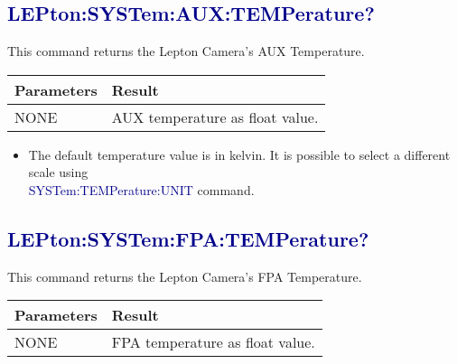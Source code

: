 \documentclass[10pt,a4paper]{article}
\begin{document}

\subsection*{\textcolor{darkblue}{LEPton:SYSTem:AUX:TEMPerature?}}

\vspace{12pt}

This command returns the Lepton Camera’s AUX Temperature.

    \begin{table}[h]
        \centering
        \begin{tabularx}{\textwidth}{|X|X|}
            \hline
            \rowcolor{gray!30} 
            Parameters & Result \\
            \hline
            NONE &  AUX temperature as float value.\\
            \hline
        \end{tabularx}
    \end{table}

    \begin{itemize}
        \item The default temperature value is in kelvin. It is possible to select a different scale using \\ 
                \textcolor{darkblue}{SYSTem:TEMPerature:UNIT} command.
    \end{itemize}

\newpage

\subsection*{\textcolor{darkblue}{LEPton:SYSTem:FPA:TEMPerature?}}

\vspace{12pt}

This command returns the Lepton Camera’s FPA Temperature.

    \begin{table}[h]
        \centering
        \begin{tabularx}{\textwidth}{|X|X|}
            \hline
            \rowcolor{gray!30} 
            Parameters & Result \\
            \hline
            NONE &  FPA temperature as float value.\\
            \hline
        \end{tabularx}
    \end{table}
\end{document}
